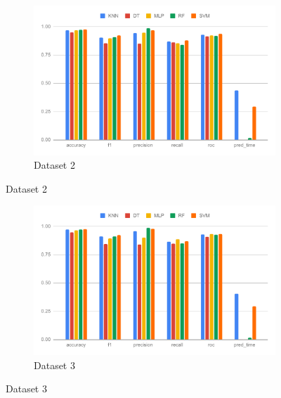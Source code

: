 \begin{figure}
  \ContinuedFloat
  \begin{subfigure}{.9\columnwidth}
    \centering
    \includegraphics[width=0.9\columnwidth]{media/data/performance/perf_ds_2.pdf}
    \caption{Dataset 2}
    \label{fig:perfromance_results_dataset_2}
  \end{subfigure}%
\end{figure}

\begin{figure}
  \ContinuedFloat
  \begin{subfigure}{.9\columnwidth}
    \centering
    \includegraphics[width=0.9\columnwidth]{media/data/performance/perf_ds_3.pdf}
    \caption{Dataset 3}
    \label{fig:perfromance_results_dataset_3}
  \end{subfigure}%
\end{figure}

